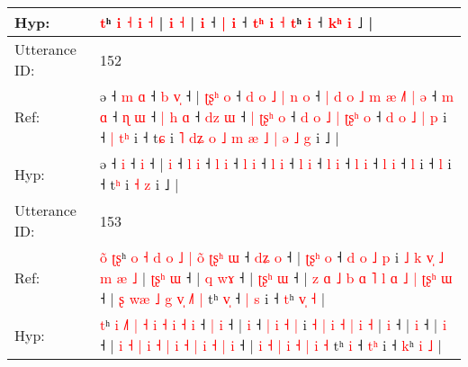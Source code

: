 \documentclass[10pt]{article}
\DeclareRobustCommand{\hl}[1]{{\textcolor{red}{#1}}}
\begin{document}
\begin{longtable}{ll}
 \\
Hyp: & \hl{}\hl{}\hl{}\hl{}\hl{}\hl{}\hl{}\hl{}\hl{t}ʰ\hl{}\hl{} \hl{i} \hl{}\hl{˧} \hl{i} \hl{˧} | \hl{}\hl{i} \hl{}\hl{˧} |\hl{}\hl{} \hl{}\hl{i} ˧ \hl{|} \hl{i} ˧\hl{}\hl{}\hl{}\hl{}\hl{}\hl{} \hl{}\hl{}\hl{t}\hl{ʰ} \hl{i} \hl{˧} \hl{}\hl{t}ʰ \hl{i} ˧ \hl{k}\hl{ʰ} \hl{i} ˩ |
 \\
\midrule
Utterance ID: & 152 \\
Ref: & ə ˧\hl{ }\hl{m} \hl{ɑ} ˧\hl{ }\hl{b} \hl{v}\hl{̩} ˧ |\hl{ }\hl{ʈ}\hl{ʂ}\hl{ʰ} \hl{o} ˧\hl{ }\hl{d}\hl{ }\hl{o}\hl{ }\hl{˩}\hl{ }\hl{|} \hl{n} \hl{o} ˧\hl{ }\hl{|}\hl{ }\hl{d}\hl{ }\hl{o}\hl{ }\hl{˩}\hl{ }\hl{m}\hl{ }\hl{æ}\hl{ }\hl{˩}\hl{˥} \hl{|} \hl{ə} ˧ \hl{m} \hl{ɑ} ˧ \hl{ɳ} \hl{ɯ} ˧\hl{ }\hl{|} \hl{h} \hl{ɑ} ˧ \hl{d}\hl{z} \hl{ɯ} ˧\hl{ }\hl{|} \hl{ʈ}\hl{ʂ}\hl{ʰ} \hl{o} ˧\hl{ }\hl{d}\hl{ }\hl{o}\hl{ }\hl{˩}\hl{ }\hl{|} \hl{ʈ}\hl{ʂ}\hl{ʰ} \hl{o} ˧\hl{ }\hl{d}\hl{ }\hl{o}\hl{ }\hl{˩}\hl{ }\hl{|} \hl{p} i ˧\hl{ }\hl{|} \hl{t}\hl{ʰ} i ˧ t\hl{ɕ} i\hl{ }\hl{˥}\hl{ }\hl{d}\hl{ʑ}\hl{ }\hl{o}\hl{ }\hl{˩}\hl{ }\hl{m}\hl{ }\hl{æ}\hl{ }\hl{˩}\hl{ }\hl{|}\hl{ }\hl{ə} \hl{˩} \hl{g} i ˩ |
 \\
Hyp: & ə ˧\hl{}\hl{} \hl{i} ˧\hl{}\hl{} \hl{}\hl{i} ˧ |\hl{}\hl{}\hl{}\hl{} \hl{i} ˧\hl{}\hl{}\hl{}\hl{}\hl{}\hl{}\hl{}\hl{} \hl{l} \hl{i} ˧\hl{}\hl{}\hl{}\hl{}\hl{}\hl{}\hl{}\hl{}\hl{}\hl{}\hl{}\hl{}\hl{}\hl{}\hl{} \hl{l} \hl{i} ˧ \hl{l} \hl{i} ˧ \hl{l} \hl{i} ˧\hl{}\hl{} \hl{l} \hl{i} ˧ \hl{}\hl{l} \hl{i} ˧\hl{}\hl{} \hl{}\hl{}\hl{l} \hl{i} ˧\hl{}\hl{}\hl{}\hl{}\hl{}\hl{}\hl{}\hl{} \hl{}\hl{}\hl{l} \hl{i} ˧\hl{}\hl{}\hl{}\hl{}\hl{}\hl{}\hl{}\hl{} \hl{l} i ˧\hl{}\hl{} \hl{}\hl{l} i ˧ t\hl{ʰ} i\hl{}\hl{}\hl{}\hl{}\hl{}\hl{}\hl{}\hl{}\hl{}\hl{}\hl{}\hl{}\hl{}\hl{}\hl{}\hl{}\hl{}\hl{}\hl{} \hl{˧} \hl{z} i ˩ |
 \\
\midrule
Utterance ID: & 153 \\
Ref: & \hl{o}\hl{̃}\hl{ }\hl{ʈ}\hl{ʂ}ʰ \hl{o} \hl{˧}\hl{ }\hl{d} \hl{o} \hl{˩} \hl{|} \hl{o}\hl{̃} \hl{ʈ}\hl{ʂ}\hl{ʰ} \hl{ɯ} ˧ \hl{d}\hl{ʑ} \hl{o} ˧ |\hl{ }\hl{ʈ}\hl{ʂ}\hl{ʰ} \hl{o} ˧ \hl{d} \hl{o} \hl{˩} \hl{p} i \hl{˩} \hl{k} \hl{v}\hl{̩} \hl{˩} \hl{m} \hl{æ} \hl{˩} |\hl{ }\hl{ʈ}\hl{ʂ}\hl{ʰ} \hl{ɯ} ˧ |\hl{ }\hl{q} \hl{w}\hl{ɤ} ˧ |\hl{ }\hl{ʈ}\hl{ʂ}\hl{ʰ} \hl{ɯ} ˧ | \hl{z} \hl{ɑ} \hl{˩} \hl{b} \hl{ɑ} \hl{˥} \hl{l} \hl{ɑ} \hl{˩} \hl{|} \hl{ʈ}\hl{ʂ}\hl{ʰ} \hl{ɯ} ˧ | \hl{ʂ} \hl{w}\hl{æ} \hl{˩} \hl{g} \hl{v}\hl{̩}\hl{ }\hl{˩}\hl{˥} \hl{|} tʰ \hl{v}\hl{̩} ˧ \hl{|}\hl{ }\hl{s} i ˧ \hl{t}ʰ \hl{v}\hl{̩} \hl{˧} |
 \\
Hyp: & \hl{}\hl{}\hl{}\hl{}\hl{t}ʰ \hl{i} \hl{}\hl{˩}\hl{˥} \hl{|} \hl{˧} \hl{i} \hl{}\hl{˧} \hl{i}\hl{ }\hl{˧} \hl{i} ˧ \hl{}\hl{|} \hl{i} ˧ |\hl{}\hl{}\hl{}\hl{} \hl{i} ˧ \hl{|} \hl{i} \hl{˧} \hl{|} i \hl{˧} \hl{|} \hl{}\hl{i} \hl{˧} \hl{|} \hl{i} \hl{˧} |\hl{}\hl{}\hl{}\hl{} \hl{i} ˧ |\hl{}\hl{} \hl{}\hl{i} ˧ |\hl{}\hl{}\hl{}\hl{} \hl{i} ˧ | \hl{i} \hl{˧} \hl{|} \hl{i} \hl{˧} \hl{|} \hl{i} \hl{˧} \hl{|} \hl{i} \hl{˧}\hl{ }\hl{|} \hl{i} ˧ | \hl{i} \hl{}\hl{˧} \hl{|} \hl{i} \hl{˧}\hl{ }\hl{|}\hl{ }\hl{i} \hl{˧} tʰ \hl{}\hl{i} ˧ \hl{}\hl{t}\hl{ʰ} i ˧ \hl{k}ʰ \hl{}\hl{i} \hl{˩} |

\end{longtable}
\end{document}
